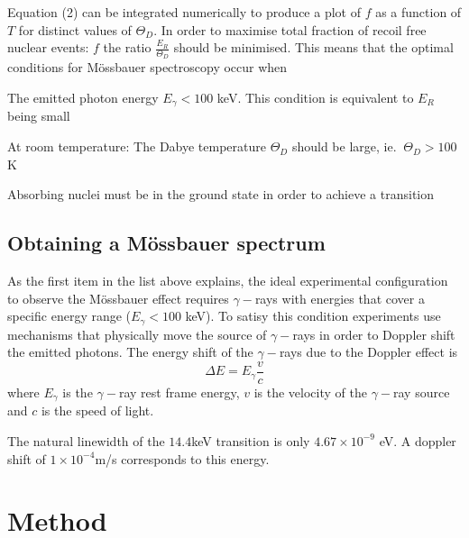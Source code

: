 \documentclass[a4paper, twocolumn]{article}
\newenvironment{itemizeReduced}{
\begin{list}{\labelitemi}{\leftmargin=1em}
\setlength{\itemsep}{1pt}
\setlength{\parskip}{0pt}
\setlength{\parsep}{0pt}}{\end{list}
}
\begin{document}
Equation (2) can be integrated numerically to produce a plot of $f$ as a function of $T$ for distinct values of $\Theta_D$\cite{8}.
In order to maximise total fraction of recoil free nuclear events: $f$ the ratio $\frac{E_R}{\Theta_D}$ should be minimised\cite{8}. 
This means that the optimal conditions for Mössbauer spectroscopy occur when 
\begin{itemizeReduced}
    \item The emitted photon energy $E_{\gamma} < 100$ keV. This condition is equivalent to $E_R$ being small
    \item At room temperature: The Dabye temperature $\Theta_D$ should be large, ie. $~\Theta_D > 100$ K\cite{13}
    \item Absorbing nuclei must be in the ground state in order to achieve a transition\cite{10}\cite{13}
\end{itemizeReduced}

\subsection{Obtaining a Mössbauer spectrum}
As the first item in the list above explains, the ideal experimental configuration to observe the Mössbauer effect requires $\gamma-$rays with energies that cover a specific energy range ($E_{\gamma} < 100$ keV). To satisy this condition experiments use mechanisms that physically move the source of $\gamma-$rays in order to Doppler shift the emitted photons\cite{10}. The energy shift of the $\gamma-$rays due to the Doppler effect is
\begin{equation} \Delta E = E_{\gamma} \frac{v}{c}
\end{equation}
where $E_{\gamma}$ is the $\gamma-$ray rest frame energy, $v$ is the velocity of the $\gamma-$ray source and $c$ is the speed of light.

The natural linewidth of the $14.4$keV transition is only $4.67 \times 10^{-9}$ eV\cite{0}. A doppler shift of $1\times10^{-4}$m/s corresponds to this energy\cite{0}.



\section{Method}
\end{document}

